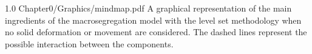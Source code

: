 
\begin{figureth}
{1.0}
{Chapter0/Graphics/mindmap.pdf}
{A graphical representation of the main ingredients of the macrosegregation model with the level set 
methodology when no solid deformation or movement are considered. 
The dashed lines represent the possible interaction between the components.}
\label{fig:mindmap}
\end{figureth}



